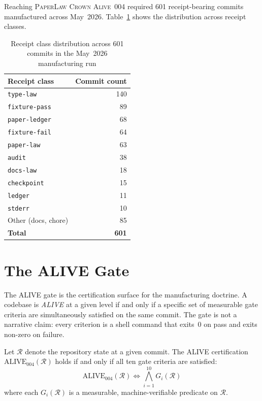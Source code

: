 Reaching \textsc{PaperLaw Crown Alive~004} required 601 receipt-bearing commits manufactured
across May~2026. Table~\ref{tab:receipt-counts} shows the distribution across receipt classes.

\begin{table}[ht]
\centering
\caption{Receipt class distribution across 601 commits in the May~2026 manufacturing run}
\label{tab:receipt-counts}
\begin{tabular}{@{}lr@{}}
\toprule
\textbf{Receipt class} & \textbf{Commit count} \\
\midrule
\texttt{type-law}      & 140 \\
\texttt{fixture-pass}  &  89 \\
\texttt{paper-ledger}  &  68 \\
\texttt{fixture-fail}  &  64 \\
\texttt{paper-law}     &  63 \\
\texttt{audit}         &  38 \\
\texttt{docs-law}      &  18 \\
\texttt{checkpoint}    &  15 \\
\texttt{ledger}        &  11 \\
\texttt{stderr}        &  10 \\
Other (docs, chore)    &  85 \\
\midrule
\textbf{Total}         & \textbf{601} \\
\bottomrule
\end{tabular}
\end{table}

\section{The ALIVE Gate}
\label{sec:doctrine-alive}

The ALIVE gate is the certification surface for the manufacturing doctrine. A codebase
is \emph{ALIVE} at a given level if and only if a specific set of measurable gate criteria
are simultaneously satisfied on the same commit. The gate is not a narrative claim: every
criterion is a shell command that exits~0 on pass and exits non-zero on failure.

\begin{definition}
\label{def:alive}
Let $\mathcal{R}$ denote the repository state at a given commit. The ALIVE certification
$\text{ALIVE}_{004}(\mathcal{R})$ holds if and only if all ten gate criteria are satisfied:
\begin{equation}
\label{eq:alive-gate}
\text{ALIVE}_{004}(\mathcal{R}) \iff \bigwedge_{i=1}^{10} G_i(\mathcal{R})
\end{equation}
where each $G_i(\mathcal{R})$ is a measurable, machine-verifiable predicate on $\mathcal{R}$.
\end{definition}

